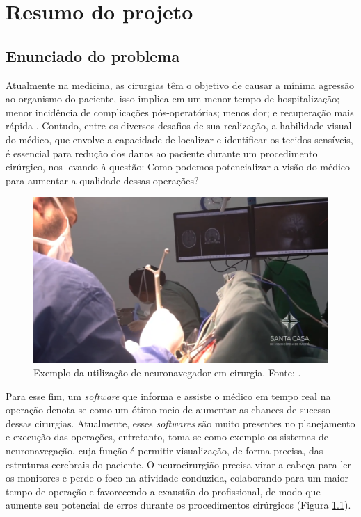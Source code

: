 \chapter{Resumo do projeto}\label{chp:resultadosEsparados}

\section{Enunciado do problema}

Atualmente na medicina, as cirurgias têm o objetivo de causar a mínima agressão ao organismo do paciente, isso implica em um menor tempo de hospitalização; menor incidência de complicações pós-operatórias; menos dor; e recuperação mais rápida \cite{MinInv}. Contudo, entre os diversos desafios de sua realização, a habilidade visual do médico, que envolve a capacidade de localizar e identificar os tecidos sensíveis, é essencial para redução dos danos ao paciente durante um procedimento cirúrgico, nos levando à questão: Como podemos potencializar a visão do médico para aumentar a qualidade dessas operações? 

\begin{figure}[h]
    \centering
    \includegraphics[width=.55\linewidth]{figuras/enunciado.png}
    \caption{Exemplo da utilização de neuronavegador em cirurgia. Fonte: \cite{santacasa}.}
    \label{fig:enunciado}
\end{figure}

Para esse fim, um \textit{software} que informa e assiste o médico em tempo real na operação denota-se como um ótimo meio de aumentar as chances de sucesso dessas cirurgias. Atualmente, esses \textit{softwares} são muito presentes no planejamento e execução das operações, entretanto, toma-se como exemplo os sistemas de neuronavegação, cuja função é permitir visualização, de forma precisa, das estruturas cerebrais do paciente. O neurocirurgião precisa virar a cabeça para ler os monitores e perde o foco na atividade conduzida, colaborando para um maior tempo de operação e favorecendo a exaustão do profissional, de modo que aumente seu potencial de erros durante os procedimentos cirúrgicos (Figura \ref{fig:enunciado}). 

